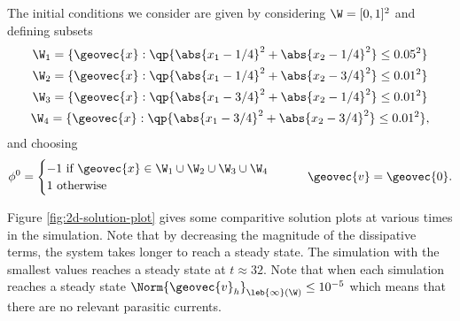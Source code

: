 \documentclass[final]{amsart}
\numberwithin{equation}{section}
\begin{document}
The initial conditions we consider are given by considering $\W =
[0,1]^2$ and defining subsets
\begin{gather}
  \W_1 = \{{\geovec{x}} : \qp{\abs{x_1 - 1/4}^2 + \abs{x_2 - 1/4}^2} \leq 0.05^2 \}
  \\
  \W_2 = \{{\geovec{x}} : \qp{\abs{x_1 - 1/4}^2 + \abs{x_2 - 3/4}^2} \leq 0.01^2 \}
  \\
  \W_3 = \{{\geovec{x}} : \qp{\abs{x_1 - 3/4}^2 + \abs{x_2 - 1/4}^2} \leq 0.01^2 \}
  \\
  \W_4 = \{{\geovec{x}} : \qp{\abs{x_1 - 3/4}^2 + \abs{x_2 - 3/4}^2} \leq 0.01^2 \},
\end{gather}
and choosing
\begin{gather}
  \label{eq:param-values-ics}
  \phi^0
  = 
  \begin{cases}
    -1 \text{ if } {\geovec{x}} \in\W_1\cup\W_2\cup\W_3\cup\W_4
    \\
    1 \text{ otherwise }
  \end{cases}
  \qquad
  {\geovec{v}} = {\geovec{0}}.
\end{gather}

Figure \ref{fig:2d-solution-plot} gives some comparitive solution
plots at various times in the simulation. Note that by decreasing the
magnitude of the dissipative terms, the system takes longer to reach a
steady state. The simulation with the smallest values reaches a steady
state at $t\approx 32$. Note that when each simulation reaches a
steady state $\Norm{{\geovec{v}}_h}_{\leb{\infty}(\W)} \leq 10^{-5}$ which
means that there are no relevant parasitic currents.
\end{document}
